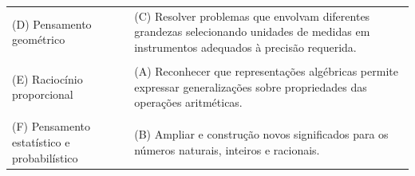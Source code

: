 \documentclass[a4paper, 12pt]{article}
\begin{document}
\begin{enumerate}
\begin{tabular}{m{5cm} m{5cm}}
    (D) Pensamento geométrico & (C) Resolver problemas que envolvam diferentes grandezas selecionando unidades de medidas em instrumentos adequados à precisão requerida. \\ \\
    (E) Raciocínio proporcional & (A) Reconhecer que representações algébricas permite expressar generalizações sobre propriedades das operações aritméticas. \\ \\
    (F) Pensamento estatístico e probabilístico & (B) Ampliar e construção novos significados para os números naturais, inteiros e racionais.
  \end{tabular}
\end{enumerate}
\end{document}
